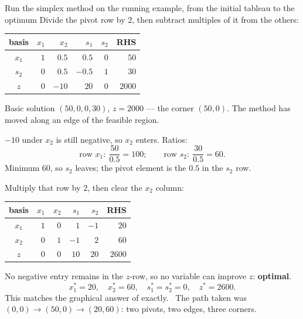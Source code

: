 \begin{worked}{Run the simplex method on the running example, from the initial tableau to the optimum}
Divide the pivot row by $2$, then subtract multiples of it from the others:
\begin{center}\footnotesize
\begin{tabular}{c|rrrr|r}
  \hline
  basis & $x_{1}$ & $x_{2}$ & $s_{1}$ & $s_{2}$ & RHS\\
  \hline
  $x_{1}$ & $1$ & $0.5$ & $0.5$ & $0$ & $50$\\
  $s_{2}$ & $0$ & $0.5$ & $-0.5$ & $1$ & $30$\\
  \hline
  $z$ & $0$ & $-10$ & $20$ & $0$ & $2000$\\
  \hline
\end{tabular}
\end{center}
Basic solution $(50,0,0,30)$, $z=2000$ --- the corner $(50,0)$. The method
has moved along an edge of the feasible region.

$-10$ under $x_{2}$ is still negative, so $x_{2}$ enters. Ratios:
\[
  \text{row }x_{1}:\ \frac{50}{0.5}=100 ;
  \qquad
  \text{row }s_{2}:\ \frac{30}{0.5}=60 .
\]
Minimum $60$, so $s_{2}$ leaves; the pivot element is the $0.5$ in the
$s_{2}$ row.

Multiply that row by $2$, then clear the $x_{2}$ column:
\begin{center}\footnotesize
\begin{tabular}{c|rrrr|r}
  \hline
  basis & $x_{1}$ & $x_{2}$ & $s_{1}$ & $s_{2}$ & RHS\\
  \hline
  $x_{1}$ & $1$ & $0$ & $1$ & $-1$ & $20$\\
  $x_{2}$ & $0$ & $1$ & $-1$ & $2$ & $60$\\
  \hline
  $z$ & $0$ & $0$ & $10$ & $20$ & $2600$\\
  \hline
\end{tabular}
\end{center}

No negative entry remains in the $z$-row, so no variable can improve $z$:
\textbf{optimal}.
\[
  \boxed{x_{1}^{*}=20,\quad x_{2}^{*}=60,\quad s_{1}^{*}=s_{2}^{*}=0,\quad z^{*}=2600 .}
\]
This matches the graphical answer of  exactly. \checkmark\ The path
taken was $(0,0)\to(50,0)\to(20,60)$: two pivots, two edges, three corners.


\end{worked}
